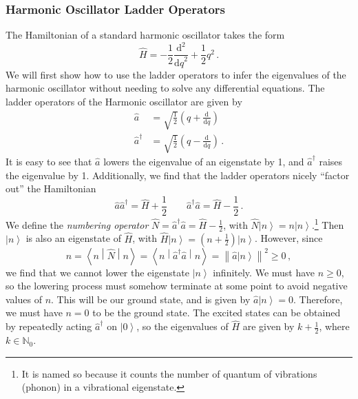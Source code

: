 \documentclass{article}
\theoremstyle{plain}\theoremheaderfont{\normalfont\itshape}\theorembodyfont{\rmfamily}\theoremseparator{.}\newtheorem*{rem}{Remark}\newtheorem*{ex}{Example}\newtheorem*{proof}{Proof}\newtheorem*{altp}{Alternative proof}
\theoremstyle{plain}\theoremheaderfont{\normalfont\bfseries}\theorembodyfont{\rmfamily}\theoremseparator{.}\newtheorem{thm}{Theorem}[section]\newtheorem{lem}[thm]{Lemma}\newtheorem{prop}[thm]{Proposition}\newtheorem*{cor}{Corollary}\newtheorem{defn}[thm]{Definition}\newtheorem{clm}[thm]{Claim}\newtheorem{clminproof}{Claim}
\theoremstyle{break}\theoremheaderfont{\normalfont\itshape}\theorembodyfont{\rmfamily}\theoremseparator{.\medskip}\newtheorem*{proofskip}{Proof}\newtheorem*{exs}{Examples}\newtheorem*{rems}{Remarks}
\theoremstyle{break}\theoremheaderfont{\normalfont\bfseries}\theorembodyfont{\rmfamily}\theoremseparator{.\medskip}\newtheorem{lemskip}[thm]{Lemma}\newtheorem{defnskip}[thm]{Definition}\newtheorem{propskip}[thm]{Proposition}\newtheorem{thmskip}[thm]{Theorem}
\numberwithin{equation}{section}
\newcommand{\dv}[3][]{\frac{\mathrm{d}^{#1} #2}{{\mathrm{d} #3}^{#1}}}
\newcommand{\ket}[1]{\left| #1 \right\rangle}
\newcommand{\mel}[3]{\left\langle #1 \middle| #2 \middle| #3 \right\rangle}
\newcommand{\vb}[1]{\bm{\mathrm{#1}}}
\newcommand{\norm}[1]{\left\| #1 \right\|}
\newcommand{\NN}{\mathbb{N}}
\begin{document}
    \subsubsection{Harmonic Oscillator Ladder Operators}
    The Hamiltonian of a standard harmonic oscillator takes the form
    \begin{equation}
        \hat{H}=-\frac{1}{2}\dv[2]{}{q}+\frac{1}{2}q^2\,.
    \end{equation}
    We will first show how to use the ladder operators to infer the eigenvalues of the harmonic oscillator without needing to solve any differential equations. The ladder operators of the Harmonic oscillator are given by
    \begin{align}
        \hat{a}&=\sqrt{\frac{1}{2}}\left(q+\dv{}{q}\right)\\
        \hat{a}^\dagger&=\sqrt{\frac{1}{2}}\left(q-\dv{}{q}\right)\,.
    \end{align}
    It is easy to see that \(\hat{a}\) lowers the eigenvalue of an eigenstate by 1, and \(\hat{a}^\dagger\) raises the eigenvalue by 1. Additionally, we find that the ladder operators nicely ``factor out'' the Hamiltonian
    \begin{equation}
        \hat{a}\hat{a}^\dagger=\hat{H}+\frac{1}{2} \qquad \hat{a}^\dagger\hat{a}=\hat{H}-\frac{1}{2}\,.
    \end{equation}
    We define the \textit{numbering operator} \(\hat{N}=\hat{a}^\dagger\hat{a}=\hat{H}-\frac{1}{2}\), with \(\hat{N}\ket{n}=n\ket{n}\).\footnote{It is named so because it counts the number of quantum of vibrations (phonon) in a vibrational eigenstate.} Then \(\ket{n}\) is also an eigenstate of \(\hat{H}\), with \(\hat{H}\ket{n}=(n+\frac{1}{2})\ket{n}\). However, since
    \begin{equation}
        n=\mel{n}{\hat{N}}{n}=\mel{n}{\hat{a}^\dagger\hat{a}}{n}=\norm{\hat{a}\ket{n}}^2\ge 0\,,
    \end{equation}
    we find that we cannot lower the eigenstate \(\ket{n}\) infinitely. We must have \(n\ge 0\), so the lowering process must somehow terminate at some point to avoid negative values of \(n\). This will be our ground state, and is given by \(\hat{a}\ket{n}=\vb{0}\). Therefore, we must have \(n=0\) to be the ground state. The excited states can be obtained by repeatedly acting \(\hat{a}^\dagger\) on \(\ket{0}\), so the eigenvalues of \(\hat{H}\) are given by \(k+\frac{1}{2}\), where \(k\in\NN_0\).
\end{document}
